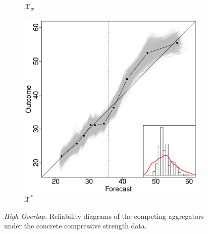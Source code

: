 \documentclass[11pt]{article}
\theoremstyle{definition}
\theoremstyle{definition}
\begin{document}
\begin{figure}
\begin{subfigure}[b]{0.323\textwidth}
                \caption{$\mathcal{X}_w$}
                \label{fig:gull}
        \end{subfigure}%
        \begin{subfigure}[b]{0.323\textwidth}
                \includegraphics[width=\textwidth]{DependentE-OLP}
                \caption{$\mathcal{X}^*$}
                \label{DepEOLPConrete}
        \end{subfigure}
          \caption{\textit{High Overlap.}  Reliability diagrams of the competing aggregators under the concrete compressive strength data.}
               \label{RelDiagramHigh}
\end{figure}
\end{document}
